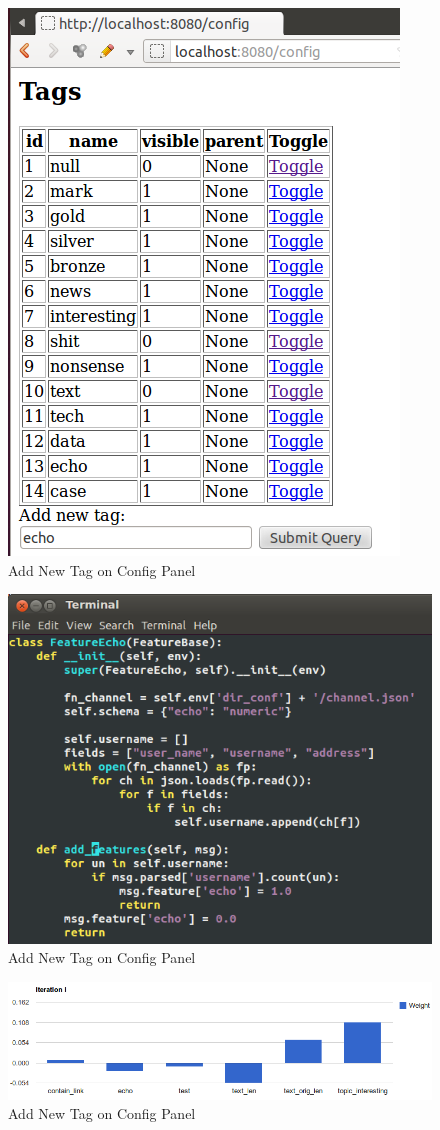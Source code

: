 \documentclass{sig-alternate}
\begin{document}
\begin{figure}[h!]
	\centering
	\includegraphics[width=0.7\linewidth]{../pic/echo_add_tag.png}
	\caption{Add New Tag on Config Panel}
\end{figure}

\begin{figure}[h!]
	\centering
	\includegraphics[width=0.7\linewidth]{../pic/echo_feature.png}
	\caption{Add New Tag on Config Panel}
\end{figure}

\begin{figure}[h!]
	\centering
	\includegraphics[width=0.7\linewidth]{../pic/echo_gd_i.png}
	\caption{Add New Tag on Config Panel}
\end{figure}
\end{document}
